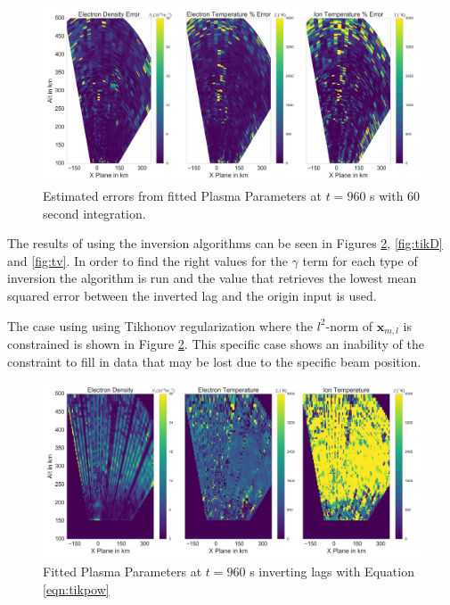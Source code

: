 \begin{figure}[!ht]
\centering
\includegraphics[width=6in]{0960_60_int_err}
\caption{Estimated errors from fitted Plasma Parameters at $t=960$ s with 60 second integration.}
\label{fig:fplparamst60errinv}
\end{figure}

The results of using the inversion algorithms can be seen in Figures \ref{fig:tikpow}, \ref{fig:tikD} and \ref{fig:tv}. In order to find the right values for the $\gamma$ term for each type of inversion the algorithm is run and the value that retrieves the lowest mean squared error between the inverted lag and the origin input is used. 

The case using using Tikhonov regularization where the $l^2$-norm of $\mathbf{x}_{m,l}$ is constrained is shown in Figure \ref{fig:tikpow}. This specific case shows an inability of the constraint to fill in data that may be lost due to the specific beam position. 

\begin{figure}[!ht]
\centering
\includegraphics[width=6in]{tikfitted}
\caption{Fitted Plasma Parameters at $t=960$ s inverting lags with Equation \ref{eqn:tikpow}}
\label{fig:tikpow}
\end{figure}

